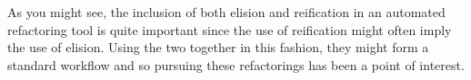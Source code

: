 As you might see, the inclusion of both elision and reification in an automated refactoring tool is quite important since the use of reification might often imply the use of elision. Using the two together in this fashion, they might form a standard workflow and so pursuing these refactorings has been a point of interest.
